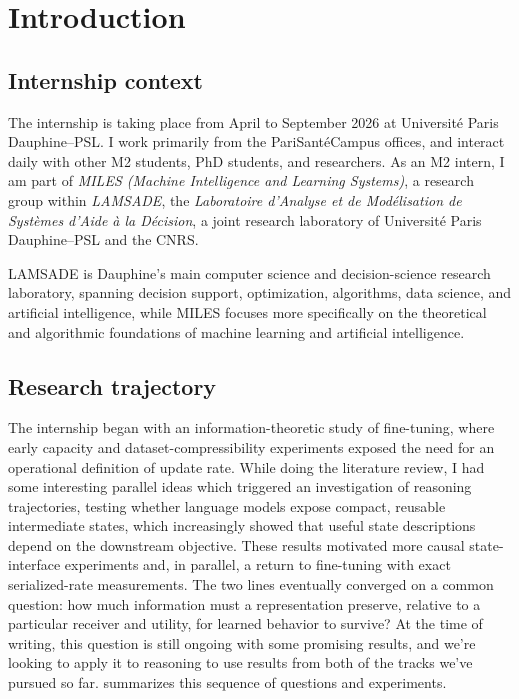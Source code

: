 \section{Introduction}
\label{sec:introduction}

\subsection{Internship context}


The internship is taking place from April to September 2026 at Université Paris Dauphine–PSL. I work primarily from the PariSantéCampus offices, and interact daily with other M2 students, PhD students, and researchers. As an M2 intern, I am part of \emph{MILES (Machine Intelligence and Learning Systems)}, a research group within \emph{LAMSADE}, the \emph{Laboratoire d’Analyse et de Modélisation de Systèmes d’Aide à la Décision}, a joint research laboratory of Université Paris Dauphine–PSL and the CNRS.

LAMSADE is Dauphine’s main computer science and decision-science research laboratory, spanning decision support, optimization, algorithms, data science, and artificial intelligence, while MILES focuses more specifically on the theoretical and algorithmic foundations of machine learning and artificial intelligence.

\subsection{Research trajectory}

The internship began with an information-theoretic study of fine-tuning, where early capacity and dataset-compressibility experiments exposed the need for an operational definition of update rate. While doing the literature review, I had some interesting parallel ideas which triggered an investigation of reasoning trajectories, testing whether language models expose compact, reusable intermediate states, which increasingly showed that useful state descriptions depend on the downstream objective. These results motivated more causal state-interface experiments and, in parallel, a return to fine-tuning with exact serialized-rate measurements. The two lines eventually converged on a common question: how much information must a representation preserve, relative to a particular receiver and utility, for learned behavior to survive? At the time of writing, this question is still ongoing with some promising results, and we're looking to apply it to reasoning to use results from both of the tracks we've pursued so far.  summarizes this sequence of questions and experiments.

